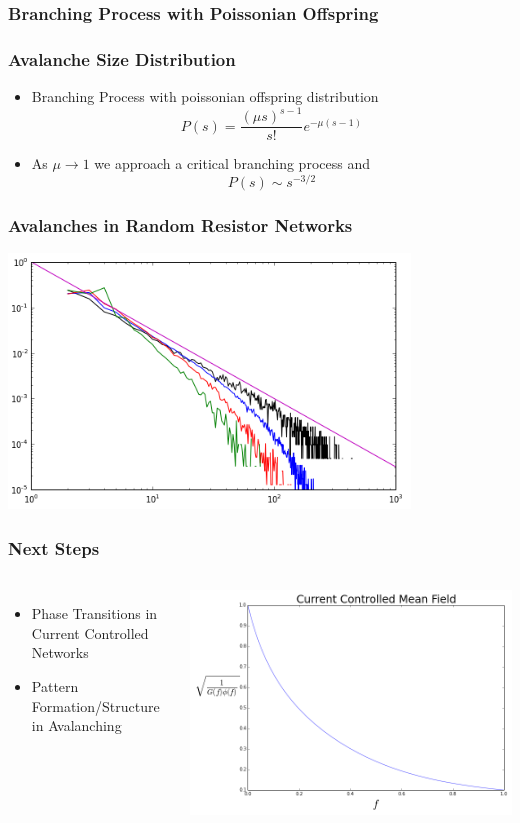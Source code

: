 \documentclass[mathserif]{beamer}
\begin{document}
\begin{frame}
\frametitle{Branching Process with Poissonian Offspring}




\end{frame}

\begin{frame}
\frametitle{Avalanche Size Distribution}
\begin{itemize}
\item<1-> Branching Process with poissonian offspring distribution
$$P(s) = \frac{(\mu s)^{s-1}}{s!} e^{-\mu(s-1)}$$
\item As $\mu\to 1$ we approach a critical branching process and
$$P(s) \sim s^{-3/2}$$
\end{itemize}
\end{frame}

\begin{frame}
\frametitle{Avalanches in Random Resistor Networks}
\includegraphics[width=0.8\textwidth]{Avalanches_p6.png}

\end{frame}

\begin{frame}
\frametitle{Next Steps}
\begin{columns}
\begin{itemize}
\item Phase Transitions in Current Controlled Networks
\item Pattern Formation/Structure in Avalanching
\end{itemize}
\includegraphics[width=\textwidth]{Current_MF.png}

\end{columns}
\end{frame}
\end{document}
